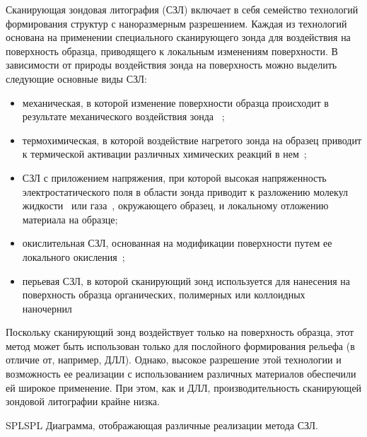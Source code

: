 Сканирующая зондовая литография (СЗЛ) включает в себя семейство технологий формирования структур с наноразмерным разрешением. Каждая из технологий основана на применении специального сканирующего зонда для воздействия на поверхность образца, приводящего к локальным изменениям поверхности. В зависимости от природы воздействия зонда на поверхность можно выделить следующие основные виды СЗЛ:
\begin{itemize}
	\item механическая, в которой изменение поверхности образца происходит в результате механического воздействия зонда ~\cite{SPL_mechanical};
	\item  термохимическая, в которой воздействие нагретого зонда на образец приводит к термической активации различных химических реакций в нем~\cite{SPL_termochemical};
	\item СЗЛ с приложением напряжения, при которой высокая напряженность электростатического поля в области зонда приводит к разложению молекул жидкости~\cite{SPL_bias_liquid} или газа~\cite{SPL_bias_gas}, окружающего образец, и локальному отложению материала на образце;
	\item окислительная СЗЛ, основанная на модификации поверхности путем ее локального окисления~\cite{SPL_oxidation};
	\item перьевая СЗЛ, в которой сканирующий зонд используется для нанесения на поверхность образца органических, полимерных или коллоидных наночернил~\cite{SPL_dip_pen_1, SPL_dip_pen_2}
\end{itemize}

Поскольку сканирующий зонд воздействует только на поверхность образца, этот метод может быть использован только для послойного формирования рельефа (в отличие от, например, ДЛЛ). Однако, высокое разрешение этой технологии и возможность ее реализации с использованием различных материалов обеспечили ей широкое применение. При этом, как и ДЛЛ, производительность сканирующей зондовой литографии крайне низка.

\begin{narrowfig}{SPL}{SPL}
	Диаграмма, отображающая различные реализации метода СЗЛ.
\end{narrowfig}
